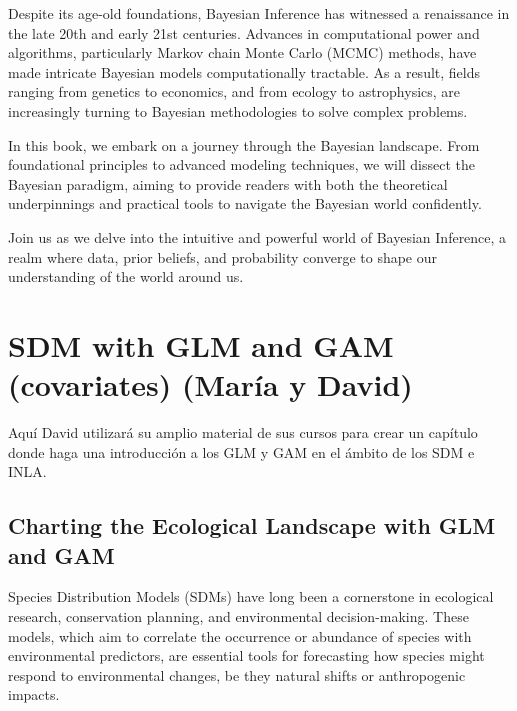 \documentclass[
]{krantz}
\begin{document}
Despite its age-old foundations, Bayesian Inference has witnessed a renaissance in the late 20th and early 21st centuries. Advances in computational power and algorithms, particularly Markov chain Monte Carlo (MCMC) methods, have made intricate Bayesian models computationally tractable. As a result, fields ranging from genetics to economics, and from ecology to astrophysics, are increasingly turning to Bayesian methodologies to solve complex problems.

In this book, we embark on a journey through the Bayesian landscape. From foundational principles to advanced modeling techniques, we will dissect the Bayesian paradigm, aiming to provide readers with both the theoretical underpinnings and practical tools to navigate the Bayesian world confidently.

Join us as we delve into the intuitive and powerful world of Bayesian Inference, a realm where data, prior beliefs, and probability converge to shape our understanding of the world around us.

\pagebreak 
\setcounter{chapter}{3}
\setcounter{section}{0}
\renewcommand{\thepage}{\arabic{page}}

\hypertarget{sdm-with-glm-and-gam-covariates-maruxeda-y-david}{%
\chapter{SDM with GLM and GAM (covariates) (María y David)}\label{sdm-with-glm-and-gam-covariates-maruxeda-y-david}}

Aquí David utilizará su amplio material de sus cursos para crear un capítulo donde haga una introducción a los GLM y GAM en el ámbito de los SDM e INLA.

\hypertarget{charting-the-ecological-landscape-with-glm-and-gam}{%
\section{Charting the Ecological Landscape with GLM and GAM}\label{charting-the-ecological-landscape-with-glm-and-gam}}

Species Distribution Models (SDMs) have long been a cornerstone in ecological research, conservation planning, and environmental decision-making. These models, which aim to correlate the occurrence or abundance of species with environmental predictors, are essential tools for forecasting how species might respond to environmental changes, be they natural shifts or anthropogenic impacts.
\end{document}
